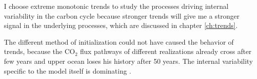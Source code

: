 I choose extreme monotonic trends to study the processes driving internal variability in the carbon cycle because stronger trends will give me a stronger signal in the underlying processes, which are discussed in chapter \ref{ch:trends}.\newline %




The different method of initialization could not have caused the behavior of trends, because the CO$_2$ flux pathways of different realizations already cross after few years and upper ocean loses his history after 50 years. The internal variability specific to the model itself is dominating \citep{Lovenduski2016}.  







\clearpage
